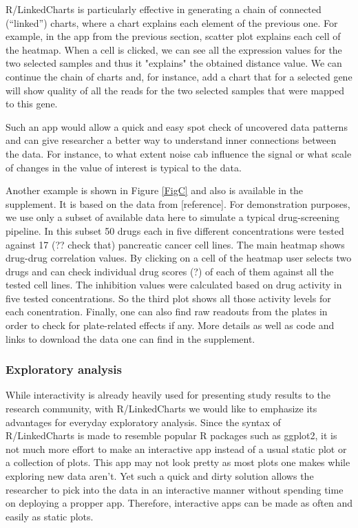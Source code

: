 \documentclass[twocolumn,10pt]{article}
\begin{document}
R/LinkedCharts is particularly effective in generating a chain of connected (``linked'') charts, where a chart explains each element of the previous one. For example, in the app from the previous section, scatter plot explains each cell of the heatmap. When a cell is clicked, we can see all the expression values for the two selected samples and thus it "explains" the obtained distance value. We can continue the chain of charts and, for instance, add a chart that for a selected gene will show quality of all the reads for the two selected samples that were mapped to this gene.

Such an app would allow a quick and easy spot check of uncovered data patterns and can give researcher a better way to understand inner connections between the data. For instance, to what extent noise cab influence the signal or what scale of changes in the value of interest is typical to the data.

Another example is shown in Figure \ref{FigC} and also is available in the supplement. It is based on the data from [reference].
For demonstration purposes, we use only a subset of available data here to simulate a typical drug-screening pipeline. In this subset 50 drugs each in five different concentrations were tested against 17 (?? check that) pancreatic cancer cell lines. The main heatmap shows drug-drug correlation values. By clicking on a cell of the heatmap user selects two drugs and can check individual drug scores (?) of each of them against all the tested cell lines. The inhibition values were calculated based on drug activity in five tested concentrations. So the third plot shows all those activity levels for each conentration. Finally, one can also find raw readouts from the plates in order to check for plate-related effects if any. More details as well as code and links to download the data one can find in the supplement.

\subsubsection{Exploratory analysis}

While interactivity is already heavily used for presenting study results to the research community, with R/LinkedCharts we would like to emphasize its advantages for everyday exploratory analysis. Since the syntax of R/LinkedCharts is made to resemble popular R packages such as ggplot2, it is not much more effort to make an interactive app instead of a usual static plot or a collection of plots. This app may not look pretty as most plots one makes while exploring new data aren't. Yet such a quick and dirty solution allows the researcher to pick into the data in an interactive manner without spending time on deploying a propper app. Therefore, interactive apps can be made as often and easily as static plots.
\end{document}

